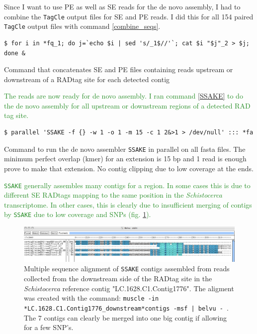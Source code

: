 \documentclass{article}\usepackage[]{graphicx}\usepackage[]{color}
\newcommand{\roger}[1]{ \textcolor[named]{ForestGreen}{#1} }
\begin{document}
Since I want to use PE as well as SE reads for the de novo assembly, I had to combine the \texttt{TagCle} output files for SE and PE reads. I did this for all 154 paired \texttt{TagCle} output files with command \ref{combine_seqs}.

\begin{command}[htb]
\captionsetup{type=command} %
\begin{Verbatim}[fontsize=\footnotesize]
$ for i in *fq_1; do j=`echo $i | sed 's/_1$//'`; cat $i "$j"_2 > $j; done &
\end{Verbatim}
\caption{Command that concatenates SE and PE files containing reads upstream or downstream of a RADtag site for each detected contig}
\label{combine_seqs}
\end{command}

\roger{The reads are now ready for de novo assembly. I ran command \ref{SSAKE} to do the de novo assembly for all upstream or downstream regions of a detected RAD tag site.}

\begin{command}[htb]
\captionsetup{type=command} %
\begin{Verbatim}[fontsize=\footnotesize]
$ parallel 'SSAKE -f {} -w 1 -o 1 -m 15 -c 1 2&>1 > /dev/null' ::: *fa
\end{Verbatim}
\caption{Command to run the de novo assembler \texttt{SSAKE} in parallel on all fasta files. The minimum perfect overlap (kmer) for an extension is 15 bp and 1 read is enough prove to make that extension. No contig clipping due to low coverage at the ends.}
\label{SSAKE}
\end{command}

\roger{\texttt{SSAKE} generally assembles many contigs for a region. In some cases this is due to different SE RADtags mapping to the same position in the \textit{Schistocerca} transcriptome. In other cases, this is clearly due to insufficient merging of contigs by \texttt{SSAKE} due to low coverage and SNPs (fig. \ref{contig_alignment}).} 

\begin{figure}[htb]
\centering
\includegraphics[width=\textwidth]{./figure/contig_alignment}
\caption{Multiple sequence alignment of \texttt{SSAKE} contigs assembled from reads collected from the downstream side of the RADtag site in the \textit{Schistocerca} reference contig "LC.1628.C1.Contig1776". The aligment was created with the command: \texttt{muscle -in *LC.1628.C1.Contig1776\_downstream*contigs -msf | belvu -}~. The 7 contigs can clearly be merged into one big contig if allowing for a few SNP's.}
\label{contig_alignment}
\end{figure}
\end{document}
